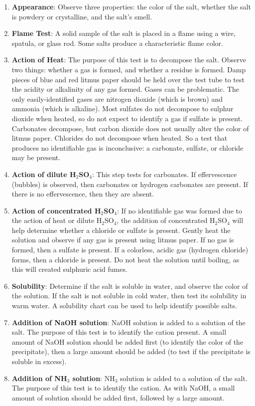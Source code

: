 \begin{enumerate}
\item \textbf{Appearance}: Observe three properties: the color of the salt, whether the salt is powdery or crystalline, and the salt’s smell.
\item \textbf{Flame Test}: A solid sample of the salt is placed in a flame using a wire, spatula, or glass rod. Some salts produce a characteristic flame color.
\item \textbf{Action of Heat}: The purpose of this test is to decompose the salt. Observe two things: whether a gas is formed, and whether a residue is formed. Damp pieces of blue and red litmus paper should be held over the test tube to test the acidity or alkalinity of any gas formed. Gases can be problematic. The only easily-identified gases are nitrogen dioxide (which is brown) and ammonia (which is alkaline). Most sulfates do not decompose to sulphur dioxide when heated, so do not expect to identify a gas if sulfate is present. Carbonates decompose, but carbon dioxide does not usually alter the color of litmus paper. Chlorides do not decompose when heated. So a test that produces no identifiable gas is inconclusive: a carbonate, sulfate, or chloride may be present.
\item \textbf{Action of dilute H$_2$SO$_4$}: This step tests for carbonates. If effervescence (bubbles) is observed, then carbonates or hydrogen carbonates are present. If there is no effervescence, then they are absent.
\item \textbf{Action of concentrated H$_2$SO$_4$}: If no identifiable gas was formed due to the action of heat or dilute H$_2$SO$_4$, the addition of concentrated H$_2$SO$_4$ will help determine whether a chloride or sulfate is present. Gently heat the solution and observe if any gas is present using litmus paper. If no gas is formed, then a sulfate is present. If a colorless, acidic gas (hydrogen chloride) forms, then a chloride is present. Do not heat the solution until boiling, as this will created sulphuric acid fumes.
\item \textbf{Solubility}: Determine if the salt is soluble in water, and observe the color of the solution. If the salt is not soluble in cold water, then test its solubility in warm water. A solubility chart can be used to help identify possible salts.
\item \textbf{Addition of NaOH solution}: NaOH solution is added to a solution of the salt. The purpose of this test is to identify the cation present. A small amount of NaOH solution should be added first (to identify the color of the precipitate), then a large amount should be added (to test if the precipitate is soluble in excess).
\item \textbf{Addition of NH$_3$ solution}: NH$_3$ solution is added to a solution of the salt. The purpose of this test is to identify the cation. As with NaOH, a small amount of solution should be added first, followed by a large amount.
\end{enumerate}




